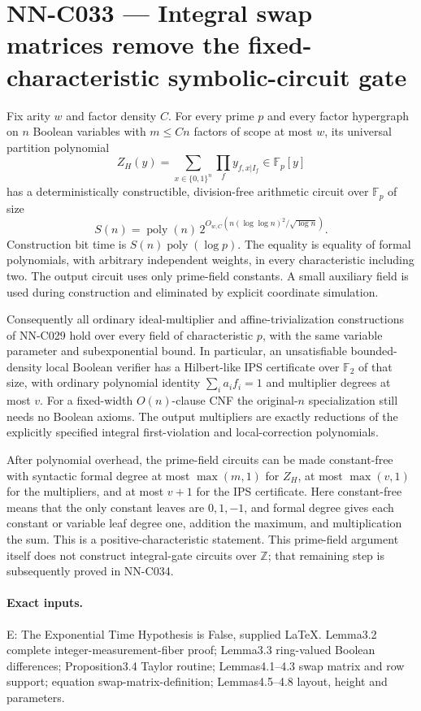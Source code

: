 \section{NN-C033 --- Integral swap matrices remove the fixed-characteristic symbolic-circuit gate}
\begin{proposition}[NN-C033]
Fix arity $w$ and factor density $C$. For every prime $p$ and every factor hypergraph on $n$ Boolean variables with $m\leq Cn$ factors of scope at most $w$, its universal partition polynomial
\[
 Z_H(y)=\sum_{x\in\{0,1\}^n}\prod_f y_{f,x|I_f}
                      \in\mathbb F_p[y]
\]
has a deterministically constructible, division-free arithmetic circuit over $\mathbb F_p$ of size
\[
 S(n)=\operatorname{poly}(n)\,
       2^{O_{w,C}(n(\log\log n)^2/\sqrt{\log n})}.
\]
Construction bit time is $S(n)\operatorname{poly}(\log p)$. The equality is equality of formal polynomials, with arbitrary independent weights, in every characteristic including two. The output circuit uses only prime-field constants. A small auxiliary field is used during construction and eliminated by explicit coordinate simulation.

Consequently all ordinary ideal-multiplier and affine-trivialization constructions of NN-C029 hold over every field of characteristic $p$, with the same variable parameter and subexponential bound. In particular, an unsatisfiable bounded-density local Boolean verifier has a Hilbert-like IPS certificate over $\mathbb F_2$ of that size, with ordinary polynomial identity $\sum_i a_i f_i=1$ and multiplier degrees at most $v$. For a fixed-width $O(n)$-clause CNF the original-$n$ specialization still needs no Boolean axioms. The output multipliers are exactly reductions of the explicitly specified integral first-violation and local-correction polynomials.

After polynomial overhead, the prime-field circuits can be made constant-free with syntactic formal degree at most $\max(m,1)$ for $Z_H$, at most $\max(v,1)$ for the multipliers, and at most $v+1$ for the IPS certificate. Here constant-free means that the only constant leaves are $0,1,-1$, and formal degree gives each constant or variable leaf degree one, addition the maximum, and multiplication the sum. This is a positive-characteristic statement. This prime-field argument itself does not construct integral-gate circuits over $\mathbb Z$; that remaining step is subsequently proved in NN-C034.
\end{proposition}
\paragraph{Exact inputs.}
E: The Exponential Time Hypothesis is False, supplied LaTeX. Lemma3.2 complete integer-measurement-fiber proof; Lemma3.3 ring-valued Boolean differences; Proposition3.4 Taylor routine; Lemmas4.1--4.3 swap matrix and row support; equation swap-matrix-definition; Lemmas4.5--4.8 layout, height and parameters.

